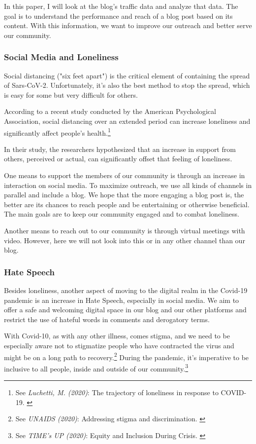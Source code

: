 In this paper, I will look at the blog's traffic data and analyze that data. The goal is to understand the performance and reach of a blog post based on its content. With this information, we want to improve our outreach and better serve our community.

\subsubsection{Social Media and Loneliness}

Social distancing ("six feet apart") is the critical element of containing the spread of Sars-CoV-2. Unfortunately, it's also the best method to stop the spread, which is easy for some but very difficult for others.

According to a recent study conducted by the American Psychological Association, social distancing over an extended period can increase loneliness and significantly affect people's health.\footnote{See \textit{Luchetti, M. (2020)}: The trajectory of loneliness in response to COVID-19. \cite{apaLoneliness}}

In their study, the researchers hypothesized that an increase in support from others, perceived or actual, can significantly offset that feeling of loneliness.

One means to support the members of our community is through an increase in interaction on social media. To maximize outreach, we use all kinds of channels in parallel and include a blog. We hope that the more engaging a blog post is, the better are its chances to reach people and be entertaining or otherwise beneficial. The main goals are to keep our community engaged and to combat loneliness.

Another means to reach out to our community is through virtual meetings with video. However, here we will not look into this or in any other channel than our blog.

\subsubsection{Hate Speech}

Besides loneliness, another aspect of moving to the digital realm in the Covid-19 pandemic is an increase in Hate Speech, especially in social media. We aim to offer a safe and welcoming digital space in our blog and our other platforms and restrict the use of hateful words in comments and derogatory terms.

With Covid-10, as with any other illness, comes stigma, and we need to be especially aware not to stigmatize people who have contracted the virus and might be on a long path to recovery.\footnote{See \textit{UNAIDS (2020)}: Addressing stigma and discrimination. \cite{addressingStigma}} During the pandemic, it's imperative to be inclusive to all people, inside and outside of our community.\footnote{See \textit{TIME's UP (2020)}: Equity and Inclusion During Crisis. \cite{equityInclusion}}

